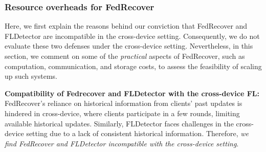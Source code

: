\subsubsection{Resource overheads for FedRecover}\label{impact:scalability:fdr_fld}
Here, we first explain the reasons behind our conviction that FedRecover and FLDetector are incompatible in the cross-device setting. Consequently, 
we do not evaluate these two defenses under the cross-device setting. Nevertheless, in this section, we comment on some of the \emph{practical} aspects of FedRecover, such as computation, communication, and storage costs, to assess the feasibility of scaling up such systems.

\noindent\textbf{Compatibility of Fedrecover and FLDetector with the cross-device FL:}
FedRecover's reliance on historical information from clients' past updates is hindered in cross-device, where clients participate in a few rounds, limiting available historical updates. Similarly, FLDetector faces challenges in the cross-device setting due to a lack of consistent historical information. Therefore, \emph{we find FedRecover and FLDetector incompatible with the cross-device setting}.

